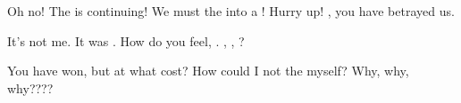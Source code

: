 \documentclass{article}
\begin{document}
	\begin{line}[1]
		Oh no! The \phrase[D]{} is continuing! We must  the  into a  ! Hurry up! \phrase[C]{}, you have betrayed us.
	\end{line}

	\begin{line}[2]
		It's not me. It was . How do you feel, \phrase[B]{}. , , ?
	\end{line}

	\begin{line}[1]
		You have won, but at what cost? How could I not  the \phrase[D]{} myself? Why, why, why????
	\end{line}
\end{document}
